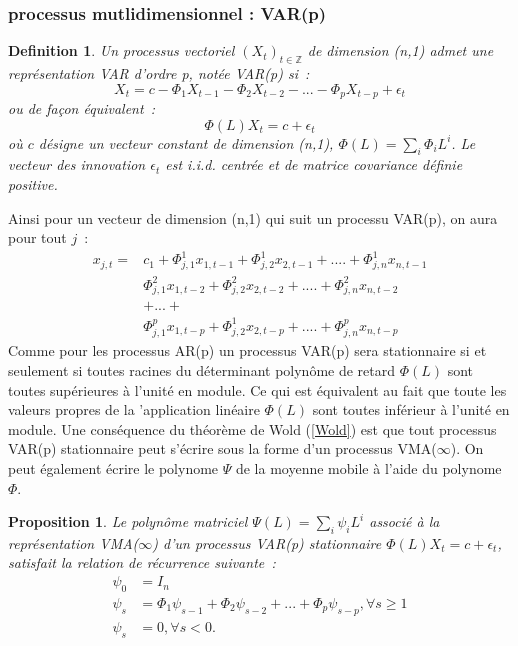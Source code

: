 \documentclass[11pt]{scrartcl} %
\newtheorem{Def}[theorem]{Definition}
\newtheorem{pro}[theorem]{Proposition}
\newcommand{\Xt}{\left(X_t\right)_{t\in\mathbb{Z}}}
\begin{document}
\subsubsection{processus mutlidimensionnel : VAR(p)}
\begin{Def}
Un processus vectoriel $\Xt$ de dimension (n,1) admet une représentation VAR d'ordre p, notée VAR(p) si~:
$$
X_t = c - \Phi_1X_{t-1}-\Phi_2X_{t-2}-...- \Phi_pX_{t-p}+\epsilon_t
$$
ou de façon équivalent~:
$$
\Phi(L)X_t = c+\epsilon_t
$$
où $c$ désigne un vecteur constant de dimension (n,1), $\Phi(L)=\sum_i\Phi_iL^i$. Le vecteur des innovation $\epsilon_t$ est i.i.d. centrée et de matrice covariance définie positive.
\end{Def}
Ainsi pour un vecteur de dimension (n,1) qui suit un processu VAR(p), on aura pour tout $j$~:
\begin{align*}
x_{j,t}=&c_1+\Phi_{j,1}^1x_{1,t-1}+\Phi_{j,2}^1x_{2,t-1}+....+\Phi_{j,n}^1x_{n,t-1}\\
& \Phi_{j,1}^2x_{1,t-2}+\Phi_{j,2}^2x_{2,t-2}+....+\Phi_{j,n}^2x_{n,t-2}\\
&+...+\\
& \Phi_{j,1}^px_{1,t-p}+\Phi_{j,2}^1x_{2,t-p}+....+\Phi_{j,n}^px_{n,t-p}
\end{align*}
Comme pour les processus AR(p) un processus VAR(p) sera stationnaire si et seulement si toutes racines du déterminant polynôme de retard $\Phi(L)$ sont toutes supérieures à l'unité en module. Ce qui est équivalent au fait que toute les valeurs propres de la 'application linéaire $\Phi(L)$ sont toutes inférieur à l'unité en module. Une conséquence du théorème de Wold (\ref{Wold}) est que tout processus VAR(p) stationnaire peut s'écrire sous la forme d'un processus VMA($\infty$). On peut également écrire le polynome $\Psi$ de la moyenne mobile à l'aide du polynome $\Phi$.
\begin{pro}
Le polynôme matriciel $\Psi(L)=\sum_i \psi_iL^i$ associé à la représentation VMA($\infty$) d'un processus VAR(p) stationnaire $\Phi(L)X_t = c + \epsilon_t$, satisfait la relation de récurrence suivante~:
\begin{align*}
\psi_0&=I_n\\
\psi_s &= \Phi_1\psi_{s-1}+\Phi_2\psi_{s-2}+...+\Phi_p\psi_{s-p},\forall s\geq 1\\
\psi_s&=0, \forall s <0.
\end{align*}
\end{pro}
\end{document}
